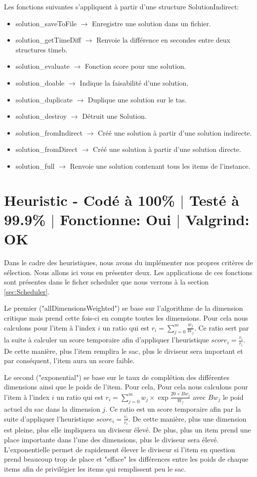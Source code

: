 \documentclass{EPUProjetPeiP}
\newcommand{\comp}[5]{
	\section[#1]{#1 {\small - Codé à #2\% $\vert$ Testé à #3\% $\vert$ Fonctionne: #4 $\vert$ Valgrind: #5}}
}
\begin{document}
Les fonctions suivantes s'appliquent à partir d'une structure SolutionIndirect:
\begin{itemize}
	\item solution\_saveToFile $\longrightarrow$ Enregistre une solution dans un fichier.
	\item solution\_getTimeDiff $\longrightarrow$ Renvoie la différence en secondes entre deux structures timeb.
	\item solution\_evaluate $\longrightarrow$ Fonction score pour une solution.
	\item solution\_doable $\longrightarrow$ Indique la faisabilité d'une solution.
	\item solution\_duplicate $\longrightarrow$ Duplique une solution sur le tas.
	\item solution\_destroy $\longrightarrow$ Détruit une Solution.
	\item solution\_fromIndirect $\longrightarrow$ Créé une solution à partir d'une solution indirecte.
	\item solution\_fromDirect $\longrightarrow$ Créé une solution à partir d'une solution directe.
	\item solution\_full $\longrightarrow$ Renvoie une solution contenant tous les items de l'instance.
\end{itemize}

\comp{Heuristic \label{sec:Heuristic}}{100}{99.9}{Oui}{OK}
Dans le cadre des heuristiques, nous avons du implémenter nos propres critères de sélection. Nous allons ici vous en présenter deux. Les applications de ces fonctions sont présentes dans le ficher scheduler que nous verrons à la section \ref{sec:Scheduler}.

Le premier ("allDimensionsWeighted") se base sur l'algorithme de la dimension critique mais prend cette fois-ci en compte toutes les dimensions. Pour cela nous calculons pour l'item à l'index $i$ un ratio qui est $r_i=\sum_{j=0}^m\frac{w_j}{W_j}$. Ce ratio sert par la suite à calculer un score temporaire afin d'appliquer l'heuristique $score_i=\frac{v_i}{r_i}$. De cette manière, plus l'item remplira le sac, plus le diviseur sera important et par conséquent, l'item aura un score faible.

Le second ("exponential") se base sur le taux de complétion des différentes dimensions ainsi que le poids de l'item. Pour cela, Pour cela nous calculons pour l'item à l'index $i$ un ratio qui est $r_i=\sum_{j=0}^mw_j\times\exp{\frac{20\times Bw_j}{W_j}}$ avec $Bw_j$ le poid actuel du sac dans la dimension $j$. Ce ratio est un score temporaire afin par la suite d'appliquer l'heuristique $score_i=\frac{v_i}{r_i}$. De cette manière, plus une dimension est pleine, plus elle impliquera un diviseur élevé. De plus, plus un item prend une place importante dans l'une des dimensions, plus le diviseur sera élevé. L'exponentielle permet de rapidement élever le diviseur si l'item en question prend beaucoup trop de place et "efface" les différences entre les poids de chaque items afin de privilégier les items qui remplissent peu le sac.
\end{document}
